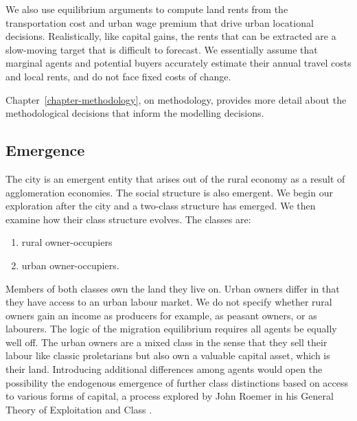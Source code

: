 We also use equilibrium arguments to compute land rents from the transportation cost and urban wage premium that drive urban locational decisions. Realistically, like capital gains, the rents that can be extracted are a slow-moving target that is difficult to forecast. We essentially assume that marginal agents and potential buyers accurately estimate their annual travel costs and local rents, and do not face fixed costs of change.   %

Chapter~\ref{chapter-methodology}, on methodology, provides more detail about the methodological decisions that inform the modelling decisions. 


\subsection{Emergence}



The city is an emergent entity that arises out of the rural economy as a result of agglomeration economies. The social structure is also emergent. We begin our exploration after the city and a two-class structure has emerged. We then examine how their class structure evolves. The classes are:
\begin{enumerate}
    \item rural owner-occupiers
    \item urban owner-occupiers.
\end{enumerate}
Members of both classes own the land they live on. Urban owners differ in that they have access to an urban labour market. We do not specify whether rural owners gain an income as producers for example, as peasant owners, or as labourers. The logic of the migration equilibrium requires all agents be equally well off. The urban owners are a mixed class in the sense that they sell their labour like classic proletarians but also own a valuable capital asset, which is their land. Introducing additional differences among agents would open the possibility  the endogenous emergence of further \gls{class} distinctions based on access to various forms of capital, a process explored by John Roemer in his General Theory of Exploitation and Class \cite{roemerGeneralTheoryExploitation1982}.

